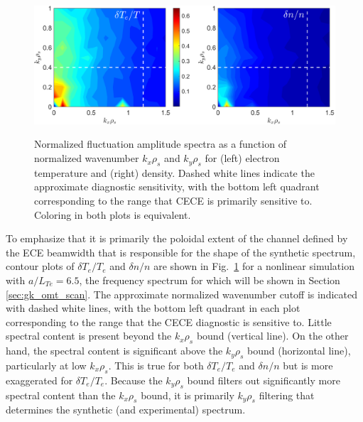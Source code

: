 \documentclass[%
 aip,
 amsmath,amssymb,
 reprint,%
]{revtex4-1}
\begin{document}
\begin{figure}[!htpb]
\centering
  {\includegraphics[width=\textwidth]{Figures/kxkycontour_omte4.png}}
\hfill
\caption{Normalized fluctuation amplitude spectra as a function of normalized wavenumber $k_x \rho_s$ and $k_y \rho_s$ for (left) electron temperature and (right) density. Dashed white lines indicate the approximate diagnostic sensitivity, with the bottom left quadrant corresponding to the range that CECE is primarily sensitive to. Coloring in both plots is equivalent. }
\label{fig:kxkyomte4}
\end{figure}

To emphasize that it is primarily the poloidal extent of the channel defined by the ECE beamwidth that is responsible for the shape of the synthetic spectrum, contour plots of $\delta T_e/T_e$  and $\delta n/n$ are shown in Fig.\ \ref{fig:kxkyomte4} for a nonlinear simulation with $a/L_{Te}=6.5$, the frequency spectrum for which will be shown in Section \ref{sec:gk_omt_scan}. The approximate normalized wavenumber cutoff is indicated with dashed white lines, with the bottom left quadrant in each plot corresponding to the range that the CECE diagnostic is sensitive to. Little spectral content is present beyond the $k_x \rho_s$ bound (vertical line). On the other hand, the spectral content is significant above the $k_y \rho_s$ bound (horizontal line), particularly at low $k_x \rho_s$. This is true for both $\delta T_e/T_e$  and $\delta n/n$ but is more exaggerated for $\delta T_e/T_e$. Because the $k_y \rho_s$ bound filters out significantly more spectral content than the $k_x \rho_s$ bound, it is primarily $k_y \rho_s$ filtering that determines the synthetic (and experimental) spectrum.
\end{document}
